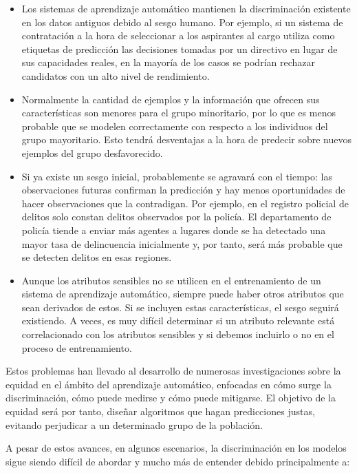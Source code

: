 \documentclass[oneside,openright,titlepage,numbers=noenddot,openany,headinclude,footinclude=true,
cleardoublepage=empty,abstractoff,BCOR=5mm,paper=a4,fontsize=12pt,main=spanish]{scrreprt}
\begin{document}
\begin{itemize}
    \item Los sistemas de aprendizaje automático mantienen la discriminación existente en los datos antiguos debido al sesgo humano. Por ejemplo, si un sistema de contratación a la hora de seleccionar a los aspirantes al cargo utiliza como etiquetas de predicción las decisiones tomadas por un directivo en lugar de sus capacidades reales, en la mayoría de los casos se podrían rechazar candidatos con un alto nivel de rendimiento.
    \item Normalmente la cantidad de ejemplos y la información que ofrecen sus características son menores para el grupo minoritario, por lo que es menos probable que se modelen correctamente con respecto a los individuos del grupo mayoritario. Esto tendrá desventajas a la hora de predecir sobre nuevos ejemplos del grupo desfavorecido.
    \item Si ya existe un sesgo inicial, probablemente se agravará con el tiempo: las observaciones futuras confirman la predicción y hay menos oportunidades de hacer observaciones que la contradigan. Por ejemplo, en el registro policial de delitos solo constan delitos observados por la policía. El departamento de policía tiende a enviar más agentes a lugares donde se ha detectado una mayor tasa de delincuencia inicialmente y, por tanto, será más probable que se detecten delitos en esas regiones. 
    \item Aunque los atributos sensibles no se utilicen en el entrenamiento de un sistema de aprendizaje automático, siempre puede haber otros atributos que sean derivados de estos. Si se incluyen estas características, el sesgo seguirá existiendo. A veces, es muy difícil determinar si un atributo relevante está correlacionado con los atributos sensibles y si debemos incluirlo o no en el proceso de entrenamiento.
\end{itemize}

Estos problemas han llevado al desarrollo de numerosas investigaciones sobre la equidad en el ámbito del aprendizaje automático, enfocadas en cómo surge la discriminación, cómo puede medirse y cómo puede mitigarse. El objetivo de la equidad será por tanto, diseñar algoritmos que hagan predicciones justas, evitando perjudicar a un determinado grupo de la población.

A pesar de estos avances, en algunos escenarios, la discriminación en los modelos sigue siendo difícil de abordar y mucho más de entender debido principalmente a: 
\end{document}
